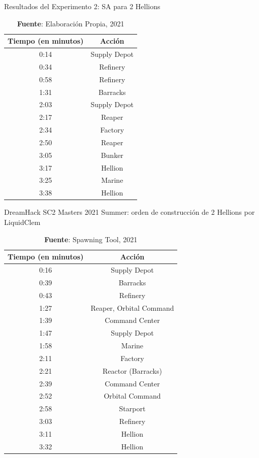 \begin{table}[H]
\centering
\def\arraystretch{1.2}
\captionsetup{justification=centering}
\caption{Resultados del Experimento 2: SA para 2 Hellions}
\label{tab:5.9}
\begin{tabular}{|c|c|}
\hline
\textbf{Tiempo (en minutos)} & \textbf{Acción} \\
\hline
0:14 & Supply Depot\\ 
0:34 & Refinery \\ 
0:58 & Refinery \\ 
1:31 & Barracks \\ 
2:03 & Supply Depot \\
2:17 & Reaper \\
2:34 & Factory \\
2:50 & Reaper \\ 
3:05 & Bunker \\ 
3:17 & Hellion \\
3:25 & Marine \\
3:38 & Hellion \\\hline
\end{tabular}
\caption*{\textbf{Fuente}: Elaboración Propia, 2021}
\end{table}

\begin{table}[H]
\centering
\def\arraystretch{1.2}
\captionsetup{justification=centering}
\caption{DreamHack SC2 Masters 2021 Summer: orden de construcción de 2 Hellions por LiquidClem}
\label{tab:5.11}
\begin{tabular}{|c|c|}
\hline
\textbf{Tiempo (en minutos)} & \textbf{Acción} \\
\hline
0:16 &	  Supply Depot	  \\
0:39 &	  Barracks	  \\
0:43 &	  Refinery	  \\
1:27 &	  Reaper, Orbital Command	  \\
1:39 &	  Command Center	  \\
1:47 &	  Supply Depot	  \\
1:58 &	  Marine	  \\
2:11 &	  Factory	  \\
2:21 &	  Reactor (Barracks)	\\  
2:39 &	  Command Center	\\  
2:52 &	  Orbital Command	\\  
2:58 &	  Starport	  \\
3:03 &	  Refinery	  \\
3:11 &	  Hellion \\
3:32 &	  Hellion \\ \hline
\end{tabular}
\caption*{\textbf{Fuente}: Spawning Tool, 2021}
\end{table}

